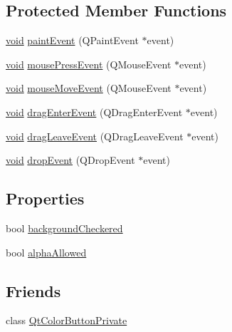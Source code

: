\subsection*{Protected Member Functions}
\begin{DoxyCompactItemize}
\item 
\hyperlink{group___u_a_v_objects_plugin_ga444cf2ff3f0ecbe028adce838d373f5c}{void} \hyperlink{class_utils_1_1_qt_color_button_a4d57edad63b440e0c4340ae4d0a4e5a9}{paint\-Event} (Q\-Paint\-Event $\ast$event)
\item 
\hyperlink{group___u_a_v_objects_plugin_ga444cf2ff3f0ecbe028adce838d373f5c}{void} \hyperlink{class_utils_1_1_qt_color_button_a22626f485585fc56fb1029419477827c}{mouse\-Press\-Event} (Q\-Mouse\-Event $\ast$event)
\item 
\hyperlink{group___u_a_v_objects_plugin_ga444cf2ff3f0ecbe028adce838d373f5c}{void} \hyperlink{class_utils_1_1_qt_color_button_aae270f713e7f84edb22a242c0fbdd10a}{mouse\-Move\-Event} (Q\-Mouse\-Event $\ast$event)
\item 
\hyperlink{group___u_a_v_objects_plugin_ga444cf2ff3f0ecbe028adce838d373f5c}{void} \hyperlink{class_utils_1_1_qt_color_button_a1f3cb44275edffe11e2b136baf0d27a8}{drag\-Enter\-Event} (Q\-Drag\-Enter\-Event $\ast$event)
\item 
\hyperlink{group___u_a_v_objects_plugin_ga444cf2ff3f0ecbe028adce838d373f5c}{void} \hyperlink{class_utils_1_1_qt_color_button_a7f3790f8da51462c3423b2a616e6443a}{drag\-Leave\-Event} (Q\-Drag\-Leave\-Event $\ast$event)
\item 
\hyperlink{group___u_a_v_objects_plugin_ga444cf2ff3f0ecbe028adce838d373f5c}{void} \hyperlink{class_utils_1_1_qt_color_button_a3e64a393badb53d187af1ac4a434e84d}{drop\-Event} (Q\-Drop\-Event $\ast$event)
\end{DoxyCompactItemize}
\subsection*{Properties}
\begin{DoxyCompactItemize}
\item 
bool \hyperlink{class_utils_1_1_qt_color_button_a4610a035893dd4f90c4ce55ac5a91592}{background\-Checkered}
\item 
bool \hyperlink{class_utils_1_1_qt_color_button_af68962155cd42dcaab96298d8222c072}{alpha\-Allowed}
\end{DoxyCompactItemize}
\subsection*{Friends}
\begin{DoxyCompactItemize}
\item 
class \hyperlink{class_utils_1_1_qt_color_button_a970ea14fbbc3cf7428513109a42a7e2e}{Qt\-Color\-Button\-Private}
\end{DoxyCompactItemize}


